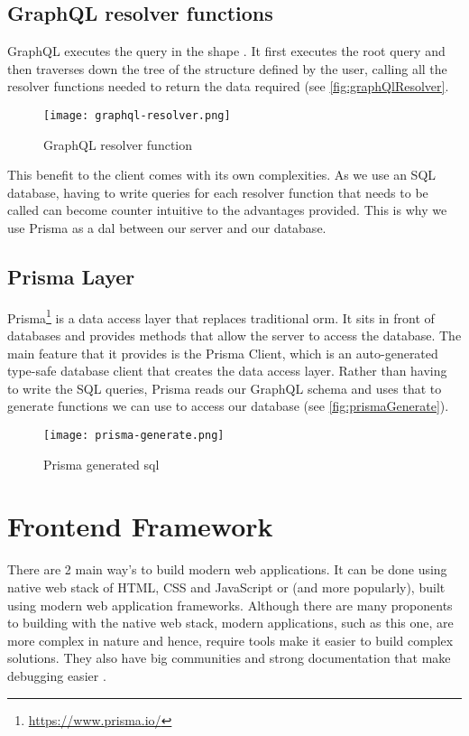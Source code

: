 \subsection{GraphQL resolver functions}
GraphQL executes the query in the shape \cite{jonas2016graphql}. It first executes the root query and then traverses down the tree of the structure defined by the user, calling all the resolver functions needed to return the data required (see \autoref{fig:graphQlResolver}.


\begin{figure}[htb!]
    \centering
    \texttt{[image: graphql-resolver.png]}
    \caption{GraphQL resolver function}
    \label{fig:graphQlResolver}
\end{figure}

This benefit to the client comes with its own complexities. As we use an SQL database, having to write queries for each resolver function that needs to be called can become counter intuitive to the advantages provided. This is why we use Prisma as a \acrfull{dal} between our server and our database.

\subsection{Prisma Layer}
Prisma\footnote{\url{https://www.prisma.io/}} is a data access layer that replaces traditional \acrfull{orm}. It sits in front of databases and provides methods that allow the server to access the database. The main feature that it provides is the Prisma Client, which is an auto-generated type-safe database client that creates the data access layer. Rather than having to write the SQL queries, Prisma reads our GraphQL schema and uses that to generate functions we can use to access our database (see \autoref{fig:prismaGenerate}).

\begin{figure}[htb!]
    \centering
    \texttt{[image: prisma-generate.png]}
    \caption{Prisma generated sql}
    \label{fig:prismaGenerate}
\end{figure}


\section{Frontend Framework} \label{sec:frontendFramework}
There are 2 main way's to build modern web applications. It can be done using native web stack of HTML, CSS and JavaScript or (and more popularly), built using modern web application frameworks. Although there are many proponents to building with the native web stack, modern applications, such as this one, are more complex in nature and hence, require tools make it easier to build complex solutions. They also have big communities and strong documentation that make debugging easier \cite{medium:WhyModernJSFrameworkExist}.


